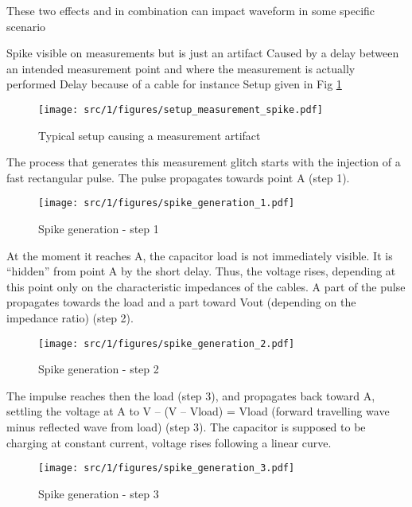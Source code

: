 These two effects and in combination can impact waveform in some specific scenario

Spike visible on measurements but is just an artifact
Caused by a delay between an intended measurement point and where the measurement is actually performed
Delay because of a cable for instance
Setup given in Fig \ref{fig:setup-measurement-spike}

\begin{figure}[!h]
  \centering
  \texttt{[image: src/1/figures/setup\_measurement\_spike.pdf]}
  \caption{Typical setup causing a measurement artifact}
  \label{fig:setup-measurement-spike}
\end{figure}

The process that generates this measurement glitch starts with the injection of a fast rectangular pulse.
The pulse propagates towards point A (step 1).

\begin{figure}[!h]
  \centering
  \texttt{[image: src/1/figures/spike\_generation\_1.pdf]}
  \caption{Spike generation - step 1}
  \label{fig:spike-step-1}
\end{figure}

At the moment it reaches A, the capacitor load is not immediately visible.
It is “hidden” from point A by the short delay.
Thus, the voltage rises, depending at this point only on the characteristic impedances of the cables.
A part of the pulse propagates towards the load and a part toward Vout (depending on the impedance ratio) (step 2).

\begin{figure}[!h]
  \centering
  \texttt{[image: src/1/figures/spike\_generation\_2.pdf]}
  \caption{Spike generation - step 2}
  \label{fig:spike-step-2}
\end{figure}

The impulse reaches then the load (step 3), and propagates back toward A, settling the voltage at A to
V – (V – Vload) = Vload (forward travelling wave minus reflected wave from load) (step 3).
The capacitor is supposed to be charging at constant current, voltage rises following a linear curve.

\begin{figure}[!h]
  \centering
  \texttt{[image: src/1/figures/spike\_generation\_3.pdf]}
  \caption{Spike generation - step 3}
  \label{fig:spike-step-3}
\end{figure}

